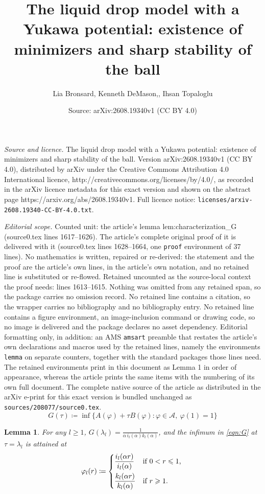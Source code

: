 \documentclass[10pt,a4paper]{amsart}
\title{The liquid drop model with a Yukawa potential: existence of minimizers and sharp stability of the ball}
\author{Lia Bronsard, Kenneth DeMason,, Ihsan Topaloglu}
\date{Source: arXiv:2608.19340v1 (CC BY 4.0)}
\newtheorem{lemma}{Lemma}
\newcommand{\defeq}{\coloneqq}
\newcommand{\disp}{\displaystyle}
\renewcommand{\geq}{\geqslant}
\renewcommand{\leq}{\leqslant}
\begin{document}
\maketitle

\noindent\emph{Source and licence.} The liquid drop model with a Yukawa potential: existence of minimizers and sharp stability of the ball. Version arXiv:2608.19340v1 (CC BY 4.0), distributed by arXiv under the Creative Commons Attribution 4.0 International licence, http://creativecommons.org/licenses/by/4.0/, as recorded in the arXiv licence metadata for this exact version and shown on the abstract page https://arxiv.org/abs/2608.19340v1. Full licence notice: \texttt{licenses/arxiv-2608.19340-CC-BY-4.0.txt}.\par\smallskip

\noindent\textit{Editorial scope.} Counted unit: the article's lemma lem:characterization\_G (source0.tex lines 1617--1626). The article's complete original proof of it is delivered with it (source0.tex lines 1628--1664, one \texttt{proof} environment of 37 lines). No mathematics is written, repaired or re-derived: the statement and the proof are the article's own lines, in the article's own notation, and no retained line is substituted or re-flowed.  Retained uncounted as the source-local context the proof needs: lines 1613--1615.  Nothing was omitted from any retained span, so the package carries no omission record.  No retained line contains a citation, so the wrapper carries no bibliography and no bibliography entry.  No retained line contains a figure environment, an image-inclusion command or drawing code, so no image is delivered and the package declares no asset dependency.  Editorial formatting only, in addition: an AMS \texttt{amsart} preamble that restates the article's own declarations and macros used by the retained lines, namely the environments \texttt{lemma} on separate counters, together with the standard packages those lines need.  The retained environments print in this document as Lemma 1 in order of appearance, whereas the article prints the same items with the numbering of its own full document.  The complete native source of the article as distributed in the arXiv e-print for this exact version is bundled unchanged as \texttt{sources/208077/source0.tex}.
	\begin{equation}\label{eqn:G}
		G(\tau) \defeq \inf \Big\{A(\varphi)+\tau B(\varphi) \colon \varphi\in\mathscr{A}, \ \varphi(1)=1\Big\}
	\end{equation}

	\begin{lemma}\label{lem:characterization_G}
		For any $l\geq 1$, $\disp G(\lambda_l) = \frac{1}{\alpha \, i_l(\alpha) k_l(\alpha)}$,
		and the infimum in \eqref{eqn:G} at $\tau=\lambda_l$ is attained at
			\[
				\varphi_l(r) \defeq \begin{dcases*}
						 				\frac{i_l(\alpha r)}{i_l(\alpha)} &  if $0<r\leq 1$, \\
						 				\frac{k_l(\alpha r)}{k_l(\alpha)}	&  if $r \geq 1$.
									\end{dcases*}
			\]
	\end{lemma}
\end{document}
